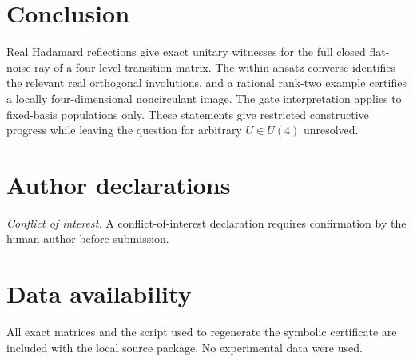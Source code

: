 \documentclass[aip,jmp,preprint]{revtex4-2}
\begin{document}
\section{Conclusion}

Real Hadamard reflections give exact unitary witnesses for the full closed flat-noise ray of a four-level transition matrix. The within-ansatz converse identifies the relevant real orthogonal involutions, and a rational rank-two example certifies a locally four-dimensional noncirculant image. The gate interpretation applies to fixed-basis populations only. These statements give restricted constructive progress while leaving the question for arbitrary $U\in U(4)$ unresolved.

\section*{Author declarations}
\textit{Conflict of interest.} A conflict-of-interest declaration requires confirmation by the human author before submission.

\section*{Data availability}
All exact matrices and the script used to regenerate the symbolic certificate are included with the local source package. No experimental data were used.


\end{document}
